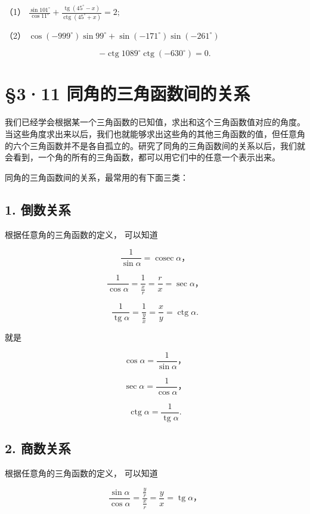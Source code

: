 （1）
\(\frac{\sin 101^{\circ}}{\cos 11^{\circ}} + \frac{\operatorname{tg}(45^{\circ} - x)}{\operatorname{ctg}(45^{\circ} + x)} = 2;\)

（2）
\(\cos (-999^{\circ})\sin 99^{\circ} + \sin (-171^{\circ})\sin (-261^{\circ})\)

\[
- \operatorname{ctg} 1089 ^{\circ} \operatorname{ctg} (- 630 ^{\circ}) = 0.
\]

\section{§3·11 同角的三角函数间的关系}

我们已经学会根据某一个三角函数的已知值，求出和这个三角函数值对应的角度。当这些角度求出来以后，我们也就能够求出这些角的其他三角函数的值，但任意角的六个三角函数并不是各自孤立的。研究了同角的三角函数间的关系以后，我们就会看到，一个角的所有的三角函数，都可以用它们中的任意一个表示出来。

同角的三角函数间的关系，最常用的有下面三类：

\subsection{1. 倒数关系}

根据任意角的三角函数的定义， 可以知道

\[
\frac1{\sin\alpha}=\operatorname{cosec}\alpha \text{，}
\]

\[
\frac {1}{\cos \alpha} = \frac {1}{\frac {x}{r}} = \frac {r}{x} = \sec \alpha \text{，}
\]

\[
\frac {1}{\operatorname{tg} \alpha} = \frac {1}{\frac {y}{x}} = \frac {x}{y} = \operatorname{ctg} \alpha .
\]

就是

\[
\cos \alpha = \frac {1}{\sin \alpha}\text{，} \tag {1}
\]

\[
\sec \alpha = \frac {1}{\cos \alpha}\text{，} \tag {2}
\]

\[
\operatorname{ctg} \alpha = \frac {1}{\operatorname{tg} \alpha}. \tag {3}
\]

\subsection{2. 商数关系}

根据任意角的三角函数的定义， 可以知道

\[
\frac {\sin \alpha}{\cos \alpha} = \frac {\frac {y}{r}}{\frac {x}{r}} = \frac {y}{x} = \operatorname{tg} \alpha \text{，}
\]

